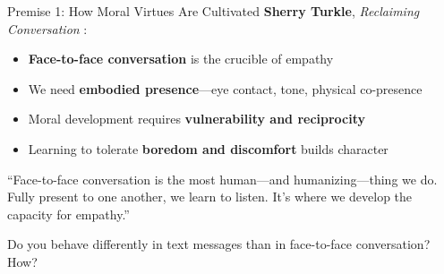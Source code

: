 ﻿\documentclass[aspectratio=169,11pt]{beamer}
\begin{document}
\begin{frame}{Premise 1: How Moral Virtues Are Cultivated}
\textbf{Sherry Turkle}, \textit{Reclaiming Conversation} \parencite{turkle_reclaiming}:

\begin{itemize}
    \item \textbf{Face-to-face conversation} is the crucible of empathy
    \item We need \textbf{embodied presence}---eye contact, tone, physical co-presence
    \item Moral development requires \textbf{vulnerability and reciprocity}
    \item Learning to tolerate \textbf{boredom and discomfort} builds character
\end{itemize}

\vspace{0.3cm}
\begin{quotebox}
``Face-to-face conversation is the most human---and humanizing---thing we do. Fully present to one another, we learn to listen. It's where we develop the capacity for empathy.''
\end{quotebox}

\begin{discussionbox}[Discussion]
Do you behave differently in text messages than in face-to-face conversation? How?
\end{discussionbox}
\end{frame}
\end{document}
